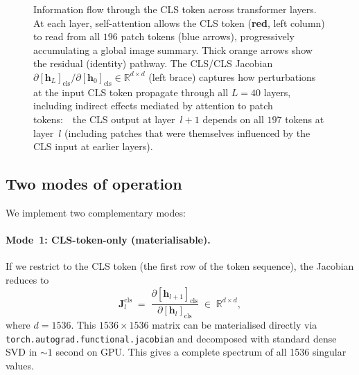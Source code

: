 \documentclass[11pt]{article}
\newcommand{\R}{\mathbb{R}}
\newcommand{\vect}[1]{\bm{#1}}
\newcommand{\mat}[1]{\mathbf{#1}}
\begin{document}
\begin{figure}[htp]
{%
}
\caption{Information flow through the CLS token across transformer
    layers.  At each layer, self-attention allows the CLS token
    ({\color{red!50!black}\textbf{red}}, left column) to read from
    all $196$ patch tokens ({\color{blue!50!cyan}blue arrows}),
    progressively accumulating a global image summary.
    Thick {\color{red!60!orange}orange arrows} show the residual
    (identity) pathway.  The CLS/CLS Jacobian
    $\partial [\vect{h}_{L}]_{\text{cls}} /
     \partial [\vect{h}_0]_{\text{cls}} \in \R^{d \times d}$
    (left brace) captures how perturbations at the input CLS token
    propagate through all $L = 40$ layers, including indirect effects
    mediated by attention to patch tokens:\ \ the CLS output at
    layer~$l\!+\!1$ depends on all $197$ tokens at layer~$l$
    (including patches that were themselves influenced by the CLS
    input at earlier layers).}
\label{fig:cls-flow}
\end{figure}

\subsection{Two modes of operation}

We implement two complementary modes:

\paragraph{Mode~1: CLS-token-only (materialisable).}
If we restrict to the CLS token (the first row of the token sequence),
the Jacobian reduces to
\begin{equation}
    \mat{J}_l^{\text{cls}} \;=\;
        \frac{\partial [\vect{h}_{l+1}]_{\text{cls}}}
             {\partial [\vect{h}_l]_{\text{cls}}}
    \;\in\; \R^{d \times d},
\end{equation}
where $d = 1536$.  This $1536 \times 1536$ matrix can be materialised
directly via \texttt{torch.autograd.functional.jacobian} and decomposed
with standard dense SVD in $\sim\!1$ second on GPU.  This gives a
complete spectrum of all 1536 singular values.
\end{document}
